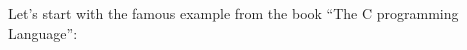 \section{\HelloWorldSectionName}
\label{sec:helloworld}

{Let's start with the famous example from the book}
``The C programming Language''\cite{Kernighan:1988:CPL:576122}:






